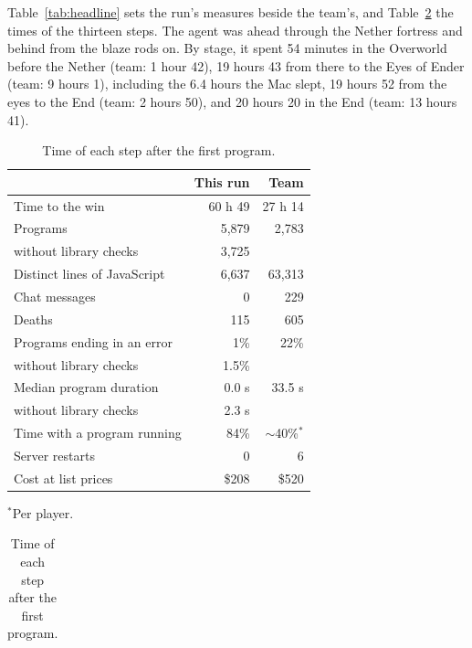 \documentclass[11pt,a4paper]{article}
\begin{document}
Table~\ref{tab:headline} sets the run's measures beside the team's, and Table~\ref{tab:stepsc} the times of the thirteen steps. The agent was ahead through the Nether fortress and behind from the blaze rods on. By stage, it spent 54 minutes in the Overworld before the Nether (team: 1 hour 42), 19 hours 43 from there to the Eyes of Ender (team: 9 hours 1), including the 6.4 hours the Mac slept, 19 hours 52 from the eyes to the End (team: 2 hours 50), and 20 hours 20 in the End (team: 13 hours 41).

\begin{table}[t]
  \begin{minipage}[t]{0.56\textwidth}
    \caption{The run's measures beside the original team's.}
    \label{tab:headline}
    \small
    \begin{tabularx}{\linewidth}{@{}Xrr@{}}
      \toprule
      & \textbf{This run} & \textbf{Team} \\
      \midrule
      Time to the win & 60 h 49 & 27 h 14 \\
      Programs & 5,879 & 2,783 \\
      \quad without library checks & 3,725 & \\
      Distinct lines of JavaScript & 6,637 & 63,313 \\
      Chat messages & 0 & 229 \\
      Deaths & 115 & 605 \\
      Programs ending in an error & 1\% & 22\% \\
      \quad without library checks & 1.5\% & \\
      Median program duration & 0.0 s & 33.5 s \\
      \quad without library checks & 2.3 s & \\
      Time with a program running & 84\% & ${\sim}$40\%$^{*}$ \\
      Server restarts & 0 & 6 \\
      Cost at list prices & \$208 & \$520 \\
      \bottomrule
    \end{tabularx}\par\vspace{3pt}
    {\footnotesize $^{*}$Per player.}
  \end{minipage}\hfill
  \begin{minipage}[t]{0.40\textwidth}
    \caption{Time of each step after the first program.}
    \label{tab:stepsc}
    \small
    \begin{tabularx}{\linewidth}{@{}Xrr@{}}

\end{tabularx}
\end{minipage}
\end{table}
\end{document}
